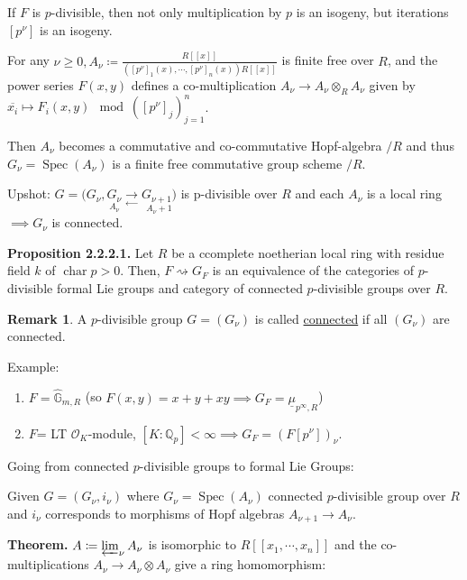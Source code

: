\documentclass{article}
\theoremstyle{definition}
\numberwithin{theorem}{subsection}
\newtheorem*{remark}{Remark}
\begin{document}
    If \(F\) is \(p\)-divisible, then not only multiplication by \(p\) is an isogeny, but iterations \([p^\nu]\) is an isogeny.
    
    For any \(\nu \geq 0, A_\nu \coloneqq \frac{R[[x]]}{([p^\nu]_1(x), \cdots , [p^\nu]_n(x)) R[[x]]}\) is finite free over \(R\), and the power series \(F(x,y)\) defines a co-multiplication \(A_\nu \to A_\nu \otimes_R A_\nu\) given by \(\overline{x_i} \mapsto F_i(x,y) \mod ([p^\nu]_j)_{j=1}^n\).

    Then \(A_\nu\) becomes a commutative and co-commutative Hopf-algebra \(/ R\) and thus \(G_\nu = \operatorname{Spec}(A_\nu)\) is a finite free commutative group scheme \(/ R\).

    Upshot: \(G = (G_\nu, \underset{A_\nu}{G_\nu} \underset{\leftarrow}{\to} \underset{A_\nu+1}{G_{\nu+1})}\)  is p\(\)-divisible over \(R\) and each \(A_\nu\) is a local ring \(\implies G_\nu\) is connected.

    \textbf{Proposition 2.2.2.1.} Let \(R\) be a ccomplete noetherian local ring with residue field \(k\) of \(\operatorname{char} p > 0\). Then, \(F \rightsquigarrow G_F\) is an equivalence of the categories of \(p\)-divisible formal Lie groups and category of connected \(p\)-divisible groups over \(R\).

    \begin{remark}
        A \(p\)-divisible group \(G = (G_\nu)\) is called \underline{connected} if all \((G_\nu)\) are connected.
    \end{remark}

    Example:

    \begin{enumerate}[label=\arabic*)]
        \item \(F = \widehat{\mathbb{G}}_{m,R}\) (so \(F(x,y) = x+y+xy \implies G_F = \underline{\mu}_{p^{\infty}, R}\))
        \item \(F\)= LT \(\mathcal{O}_K\)-module, \([K:\mathbb{Q}_p] < \infty \implies G_F = (F[p^\nu])_\nu\). 
    \end{enumerate} 

    Going from connected \(p\)-divisible groups to formal Lie Groups:

    Given \(G = (G_\nu, i_\nu)\) where \(G_\nu = \operatorname{Spec}(A_\nu)\) connected \(p\)-divisible group over \(R\) and \(i_\nu\) corresponds to morphisms of Hopf algebras \(A_{\nu+1} \to A_\nu\).

    \textbf{Theorem.} \(A \coloneqq \varprojlim_{\nu} A_\nu\) is isomorphic to \(R[[x_1, \cdots , x_n]]\) and the co-multiplications \(A_\nu \to A_\nu \otimes A_\nu\) give a ring homomorphism:
    
\end{document}
